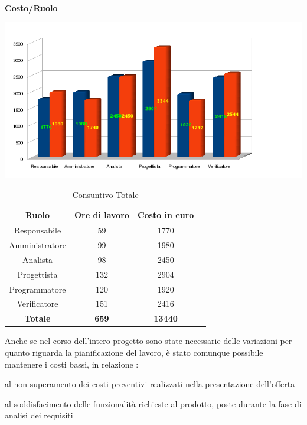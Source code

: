 \newpage
\begin{center}\textbf{Costo/Ruolo}
\end{center}
\includegraphics[width=420pt]{Cons-Costi-Totale}

\begin{table}[h]
	\begin{center}
		  \begin{tabular}{|c|c|c|c|}
		 \hline 
		 \textbf{Ruolo} & \textbf{Ore di lavoro} & \textbf{Costo in euro}\\
		 \hline
		Responsabile & 59 & 1770 \\
		Amministratore & 99 & 1980\\
		Analista & 98 & 2450\\
		Progettista & 132 & 2904\\
		Programmatore & 120 & 1920\\
		Verificatore & 151 & 2416\\
        \hline
        \textbf{Totale} & \textbf{659} & \textbf{13440}\\
		\hline
		\end{tabular}
	\caption{Consuntivo Totale} 
	\label{tab:cons_Totale}
	\end{center}	
\end{table}

Anche se nel corso dell'intero progetto sono state necessarie delle variazioni per quanto
riguarda la pianificazione del lavoro, \`e stato comunque possibile mantenere i costi
bassi, in relazione :
\begin{elenconumerato}{\normindent}
				\item al non superamento dei costi preventivi realizzati nella presentazione dell'offerta
				\item al soddisfacimento delle funzionalit\`a richieste al prodotto, poste durante la fase di
       analisi dei requisiti
\end{elenconumerato}

